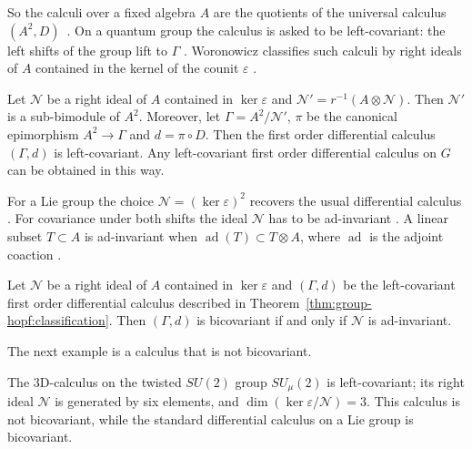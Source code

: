 So the calculi over a fixed algebra $A$ are the quotients of the universal
calculus $(A^2,D)$~\cite[p.~132]{Woronowicz1989}. On a quantum group the calculus is asked to be
left-covariant: the left shifts of the group lift to $\Gamma$
\cite[p.~132]{Woronowicz1989}. Woronowicz classifies such calculi by right
ideals of $A$ contained in the kernel of the counit $\varepsilon$
\cite[p.~132]{Woronowicz1989}.

\begin{theorem}\label{thm:group-hopf:classification}
Let $\mathcal{N}$ be a right ideal of $A$ contained in $\ker\varepsilon$ and
$\mathcal{N}'=r^{-1}(A\otimes\mathcal{N})$. Then $\mathcal{N}'$ is a sub-bimodule of
$A^2$. Moreover, let $\Gamma=A^2/\mathcal{N}'$, $\pi$ be the canonical epimorphism
$A^2\to\Gamma$ and $d=\pi\circ D$. Then the first order differential calculus
$(\Gamma,d)$ is left-covariant. Any left-covariant first order differential calculus
on $G$ can be obtained in this way.
\end{theorem}

For a Lie group the choice $\mathcal{N}=(\ker\varepsilon)^2$ recovers the
usual differential calculus \cite[p.~132]{Woronowicz1989}. For covariance
under both shifts the ideal $\mathcal{N}$ has to be ad-invariant
\cite[p.~134]{Woronowicz1989}. A linear subset $T\subset A$ is ad-invariant
when $\operatorname{ad}(T)\subset T\otimes A$, where $\operatorname{ad}$ is
the adjoint coaction \cite[p.~133]{Woronowicz1989}.

\begin{theorem}\label{thm:group-hopf:bicovariant}
Let $\mathcal{N}$ be a right ideal of $A$ contained in $\ker\varepsilon$ and
$(\Gamma,d)$ be the left-covariant first order differential calculus described in
Theorem~\ref{thm:group-hopf:classification}. Then $(\Gamma,d)$ is bicovariant if and
only if $\mathcal{N}$ is ad-invariant.
\end{theorem}

The next example is a calculus that is not bicovariant.

\begin{example}\label{ex:group-hopf:3d}
The 3D-calculus on the twisted $SU(2)$ group $SU_\mu(2)$ is left-covariant; its
right ideal $\mathcal{N}$ is generated by six elements, and
$\dim(\ker\varepsilon/\mathcal{N})=3$. This calculus is not bicovariant, while the
standard differential calculus on a Lie group is bicovariant.
\end{example}

